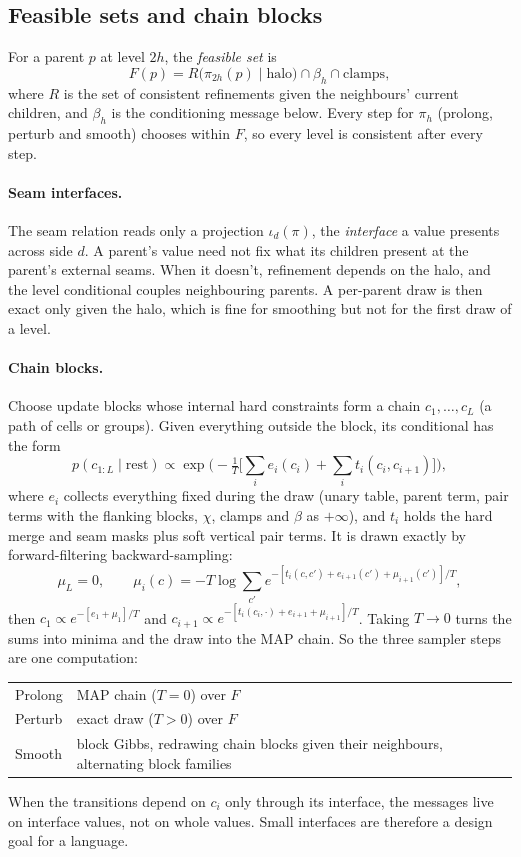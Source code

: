\documentclass[11pt]{article}
\newcommand{\1}{\mathds{1}}
\begin{document}
\subsection{Feasible sets and chain blocks}

For a parent $p$ at level $2h$, the \emph{feasible set} is
\[
  F(p) = R\big(\pi_{2h}(p) \mid \text{halo}\big) \cap \beta_h \cap \text{clamps},
\]
where $R$ is the set of consistent refinements given the neighbours' current children, and
$\beta_h$ is the conditioning message below. Every step for $\pi_h$ (prolong, perturb and
smooth) chooses within $F$, so every level is consistent after every step.

\paragraph{Seam interfaces.} The seam relation reads only a projection $\iota_d(\pi)$, the
\emph{interface} a value presents across side $d$. A parent's value need not fix what its
children present at the parent's external seams. When it doesn't, refinement depends on the
halo, and the level conditional couples neighbouring parents. A per-parent draw is then exact
only given the halo, which is fine for smoothing but not for the first draw of a level.

\paragraph{Chain blocks.} Choose update blocks whose internal hard constraints form a chain
$c_1,\dots,c_L$ (a path of cells or groups). Given everything outside the block, its
conditional has the form
\[
  p(c_{1:L} \mid \text{rest}) \propto
  \exp\!\Big(-\tfrac1T\Big[\sum_i e_i(c_i) + \sum_i t_i(c_i, c_{i+1})\Big]\Big),
\]
where $e_i$ collects everything fixed during the draw (unary table, parent term, pair terms
with the flanking blocks, $\chi$, clamps and $\beta$ as $+\infty$), and $t_i$ holds the hard
merge and seam masks plus soft vertical pair terms. It is drawn exactly by forward-filtering
backward-sampling:
\[
  \mu_L = 0, \qquad
  \mu_i(c) = -T\log\sum_{c'} e^{-[t_i(c,c') + e_{i+1}(c') + \mu_{i+1}(c')]/T},
\]
then $c_1 \propto e^{-[e_1 + \mu_1]/T}$ and $c_{i+1} \propto
e^{-[t_i(c_i,\cdot) + e_{i+1} + \mu_{i+1}]/T}$. Taking $T \to 0$ turns the sums into minima
and the draw into the MAP chain. So the three sampler steps are one computation:
\begin{center}
\begin{tabular}{@{}ll@{}}
\toprule
Prolong & MAP chain ($T = 0$) over $F$ \\
Perturb & exact draw ($T > 0$) over $F$ \\
Smooth  & block Gibbs, redrawing chain blocks given their neighbours, alternating block families \\
\bottomrule
\end{tabular}
\end{center}
When the transitions depend on $c_i$ only through its interface, the messages live on interface
values, not on whole values. Small interfaces are therefore a design goal for a language.
\end{document}
